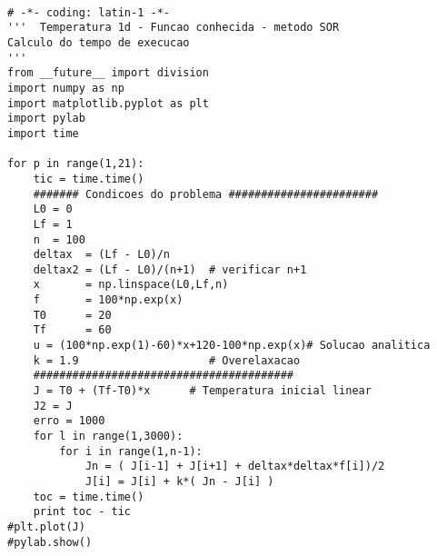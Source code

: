 \lstset{language=Python}
\begin{lstlisting}

# -*- coding: latin-1 -*-
'''  Temperatura 1d - Funcao conhecida - metodo SOR  
Calculo do tempo de execucao
'''  
from __future__ import division
import numpy as np
import matplotlib.pyplot as plt
import pylab
import time

for p in range(1,21):
	tic = time.time()
	####### Condicoes do problema #######################
	L0 = 0
	Lf = 1
	n  = 100
	deltax  = (Lf - L0)/n
	deltax2 = (Lf - L0)/(n+1)  # verificar n+1
	x       = np.linspace(L0,Lf,n)
	f       = 100*np.exp(x)
	T0      = 20
	Tf      = 60
	u = (100*np.exp(1)-60)*x+120-100*np.exp(x)# Solucao analitica
	k = 1.9                    # Overelaxacao
	########################################
	J = T0 + (Tf-T0)*x      # Temperatura inicial linear
	J2 = J
	erro = 1000
	for l in range(1,3000):
		for i in range(1,n-1):
			Jn = ( J[i-1] + J[i+1] + deltax*deltax*f[i])/2
			J[i] = J[i] + k*( Jn - J[i] )	
	toc = time.time()
	print toc - tic
#plt.plot(J)
#pylab.show()

\end{lstlisting}